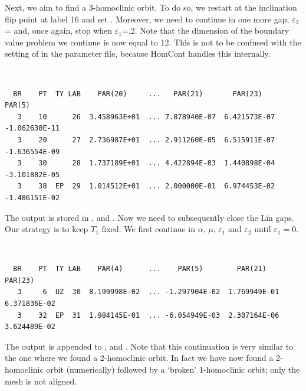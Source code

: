 Next, we aim to find a 3-homoclinic orbit. To do so, we
restart at the inclination flip point at label 16 and set
. Moreover, we need to continue in one more
gap, $\varepsilon_2$= and, once again, stop
when $\varepsilon_1$=.2. Note that the 
dimension of the boundary value problem we continue
is now equal to 12. This is not to be confused with the setting
of  in the parameter file, because {\cal HomCont} handles this
internally.
\begin{center}
 \\
\end{center} 
\begin{verbatim}
  BR    PT  TY LAB    PAR(20)     ...   PAR(21)       PAR(23)       PAR(5)
   3    10      26  3.458963E+01  ... 7.878940E-07  6.421573E-07 -1.062630E-11
   3    20      27  2.736987E+01  ... 2.911260E-05  6.515911E-07 -1.636554E-09
   3    30      28  1.737189E+01  ... 4.422894E-03  1.440898E-04 -3.101882E-05
   3    38  EP  29  1.014512E+01  ... 2.000000E-01  6.974453E-02 -1.486151E-02
\end{verbatim}
The output is stored in ,   and .
Now we need to subsequently close the Lin gaps. Our strategy is to
keep $T_1$ fixed. We first continue in $\alpha$, $\mu$,
$\varepsilon_1$ and $\varepsilon_2$ until $\varepsilon_1=0$.
\begin{center}
 \\
\end{center} 
\begin{verbatim}
  BR    PT  TY LAB    PAR(4)      ...    PAR(5)        PAR(21)       PAR(23)    
   3     6  UZ  30  8.199998E-02  ... -1.297904E-02  1.769949E-01  6.371836E-02
   3    32  EP  31  1.984145E-01  ... -6.054949E-03  2.307164E-06  3.624489E-02
\end{verbatim}
The output is appended to ,   and .
Note that this continuation is very similar to the one where we found
a 2-homoclinic orbit. In fact we have now found a 2-homoclinic orbit
(numerically) followed by a `broken' 1-homoclinic orbit; only the mesh
is not aligned.

